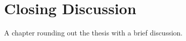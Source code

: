 \chapter{Closing Discussion}\label{chap:closing_discussion}

A chapter rounding out the thesis with a brief discussion.